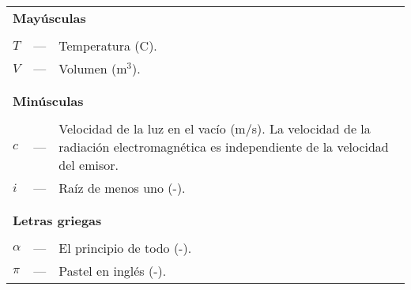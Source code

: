
\avisoLocalizacionArchivo

\begin{longtable}{lcp{} }
\multicolumn{3}{l}{\textbf{Mayúsculas}}\\
\\
$T$ & --- & Temperatura (\textordmasculine{}C).\\
$V$ & --- & Volumen (m$^3$).\\
\\
\\
\multicolumn{3}{l}{\textbf{Minúsculas}}\\
\\
$c$ & --- & Velocidad de la luz en el vacío (m/s). La velocidad de la radiación electromagnética es independiente de la velocidad del emisor.\\
$i$ & --- & Raíz de menos uno (-).\\
\\
\\
\multicolumn{3}{l}{\textbf{Letras griegas}}\\
\\
$\alpha$ & --- & El principio de todo (-).\\
$\pi$ & --- & Pastel en inglés (-).\\
\end{longtable}
